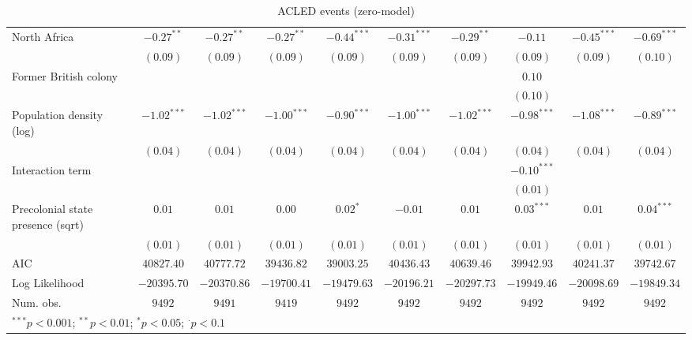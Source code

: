 \begin{sidewaystable}
\begin{center}
{\begin{tabular}{l c c c c c c c c c}
North Africa                          & $-0.27^{**}$   & $-0.27^{**}$   & $-0.27^{**}$  & $-0.44^{***}$ & $-0.31^{***}$ & $-0.29^{**}$  & $-0.11$       & $-0.45^{***}$ & $-0.69^{***}$   \\
                                      & $(0.09)$       & $(0.09)$       & $(0.09)$      & $(0.09)$      & $(0.09)$      & $(0.09)$      & $(0.09)$      & $(0.09)$      & $(0.10)$        \\
Former British colony                 &                &                &               &               &               &               & $0.10$        &               &                 \\
                                      &                &                &               &               &               &               & $(0.10)$      &               &                 \\
Population density (log)              & $-1.02^{***}$  & $-1.02^{***}$  & $-1.00^{***}$ & $-0.90^{***}$ & $-1.00^{***}$ & $-1.02^{***}$ & $-0.98^{***}$ & $-1.08^{***}$ & $-0.89^{***}$   \\
                                      & $(0.04)$       & $(0.04)$       & $(0.04)$      & $(0.04)$      & $(0.04)$      & $(0.04)$      & $(0.04)$      & $(0.04)$      & $(0.04)$        \\
Interaction term                      &                &                &               &               &               &               & $-0.10^{***}$ &               &                 \\
                                      &                &                &               &               &               &               & $(0.01)$      &               &                 \\
Precolonial state presence (sqrt)     & $0.01$         & $0.01$         & $0.00$        & $0.02^{*}$    & $-0.01$       & $0.01$        & $0.03^{***}$  & $0.01$        & $0.04^{***}$    \\
                                      & $(0.01)$       & $(0.01)$       & $(0.01)$      & $(0.01)$      & $(0.01)$      & $(0.01)$      & $(0.01)$      & $(0.01)$      & $(0.01)$        \\
\midrule
AIC                                   & $40827.40$     & $40777.72$     & $39436.82$    & $39003.25$    & $40436.43$    & $40639.46$    & $39942.93$    & $40241.37$    & $39742.67$      \\
Log Likelihood                        & $-20395.70$    & $-20370.86$    & $-19700.41$   & $-19479.63$   & $-20196.21$   & $-20297.73$   & $-19949.46$   & $-20098.69$   & $-19849.34$     \\
Num. obs.                             & $9492$         & $9491$         & $9419$        & $9492$        & $9492$        & $9492$        & $9492$        & $9492$        & $9492$          \\
\bottomrule
\multicolumn{10}{l}{\scriptsize{$^{***}p<0.001$; $^{**}p<0.01$; $^{*}p<0.05$; $^{\cdot}p<0.1$}}
\end{tabular}
}
\caption{ACLED events (zero-model)}
\label{zacledev}
\end{center}
\end{sidewaystable}
